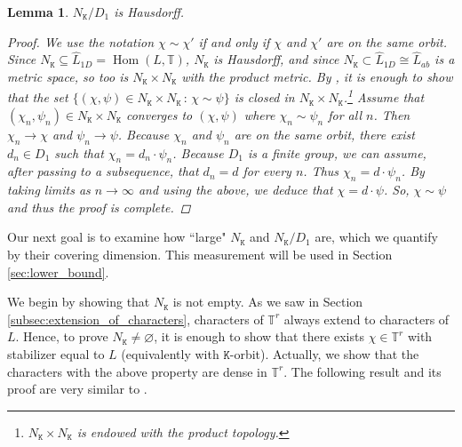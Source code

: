 \documentclass[11pt, twoside]{amsart}
\newcommand{\te}[1]{\operatorname{#1}}
\newcommand{\tn}{\mathbb{T}}
\newcommand{\sse}{\subseteq}
\newcommand{\mt}{\mathtt}
\newcommand{\wh}{\widehat}
\newtheorem{lemma}[thm]{Lemma}
\theoremstyle{definition}
\newcommand{\TT}{\mathbb{T}}
\begin{document}
\begin{lemma}\label{quot_is_hausdorff}
    $N_{\mt{K}}/D_1$ is Hausdorff.
    \begin{proof}
 We use the notation $\chi \sim \chi'$ if and only if $\chi$ and $\chi'$ are on the same orbit. Since $N_{\mt{K}}\sse \wh{L}_{1D}=\te{Hom}(L,\tn)$, $N_{\mt{K}}$ is Hausdorff, and since $N_{\mt{K}}\subset \wh{L}_{1D}\cong \wh{L}_{ab}$ is a metric space, so too is $N_{\mt{K}}\times N_{\mt{K}}$ with the product metric. By \cite[Ex. 2.4.C(c)]{engelking_topology}, it is enough to show that the set $\{(\chi,\psi)\in N_{\mt{K}}\times N_{\mt{K}}\,\colon\,\chi\sim \psi\}$ is closed in $N_{\mt{K}}\times N_{\mt{K}}$.\footnote{$N_{\mt{K}}\times N_{\mt{K}}$ is endowed with the product topology.} Assume that $(\chi_n,\psi_n)\in N_{\mt{K}}\times N_{\mt{K}}$ converges to $(\chi,\psi)$ where $\chi_n\sim \psi_n$ for all $n$. Then $\chi_n\to \chi$ and $\psi_n\to \psi$. Because $\chi_n$ and $\psi_n$ are on the same orbit, there exist $d_n\in D_1$ such that $\chi_n=d_n\cdot \psi_n$. Because $D_1$ is a finite group, we can assume, after passing to a subsequence, that $d_n=d$ for every $n$. Thus $\chi_n=d\cdot \psi_n$. By taking limits as $n\to \infty$ and using the above, we deduce that $\chi=d\cdot \psi$. So, $\chi\sim \psi$ and thus the proof is complete. 
    \end{proof}
\end{lemma}
Our next goal is to examine how ``large" $N_{\mt{K}}$ and $N_{\mt{K}}\slash D_1$ are, which we quantify by their covering dimension. This measurement will be used in Section \ref{sec:lower_bound}.  \par

We begin by showing that $N_{\mt{K}}$ is not empty. As we saw in Section \ref{subsec:extension_of_characters}, characters of $\TT^r$ always extend to characters of $L$. Hence, to prove $N_{\mt{K}}\neq\varnothing$, it is enough to show that there exists $\chi\in \TT^r$ with stabilizer equal to $L$ (equivalently with $\mt{K}$-orbit). Actually, we show that the characters with the above property are dense in $\TT^r$. The following result and its proof are very similar to \cite[Lemma 2.1]{strongly_qd_eckhardt}.
\end{document}
